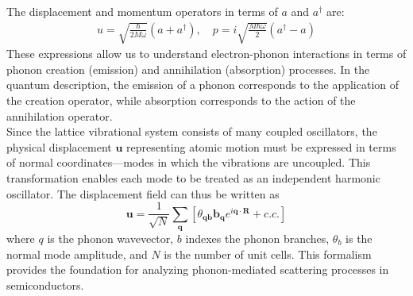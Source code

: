 The displacement and momentum operators in terms of $a$ and $a^\dagger$ are:
\begin{align*}
	u = \sqrt{\frac{\hbar}{2 M \omega}} (a + a^\dagger), \quad
	p = i \sqrt{\frac{M \hbar \omega}{2}} (a^\dagger - a)
\end{align*}
These expressions allow us to understand electron-phonon interactions in terms of phonon creation (emission) and annihilation (absorption) processes. In the quantum description, the emission of a phonon corresponds to the application of the creation operator, while absorption corresponds to the action of the annihilation operator.\\
Since the lattice vibrational system consists of many coupled oscillators, the physical displacement $\mathbf{u}$ representing atomic motion must be expressed in terms of normal coordinates—modes in which the vibrations are uncoupled. This transformation enables each mode to be treated as an independent harmonic oscillator. The displacement field can thus be written as
\begin{equation}
	\mathbf{u} = \frac{1}{\sqrt{N}} \sum_{\mathbf{q}} \left[\theta_{\mathbf{qb}} \mathbf{b}_\mathbf{q} e^{i \mathbf{q} \cdot \mathbf{R}}  + c.c. \right]
\end{equation}
where $q$ is the phonon wavevector, $b$ indexes the phonon branches, $\theta_b$ is the normal mode amplitude, and $N$ is the number of unit cells. This formalism provides the foundation for analyzing phonon-mediated scattering processes in semiconductors.

